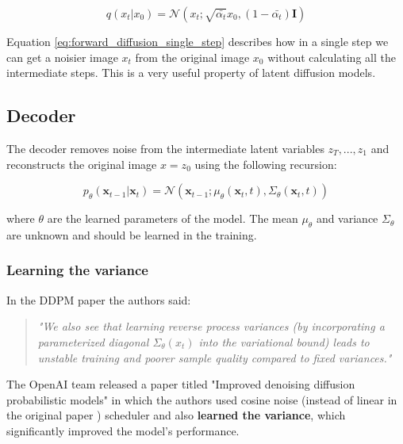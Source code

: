 \begin{equation}
    q(x_t | x_0) = \mathcal{N} (x_t; \sqrt{\bar{\alpha_t}} x_0, (1-\bar{\alpha_t}) \mathbf{I})
    \label{eq:forward_diffusion_single_step}
\end{equation}

Equation \ref{eq:forward_diffusion_single_step} describes how in a single step we can get a noisier image $x_t$ from the original image $x_0$ without calculating all the intermediate steps. This is a very useful property of latent diffusion models.









\subsection{Decoder}

The decoder removes noise from the intermediate latent variables $z_T, ..., z_1$ and reconstructs the original image $x = z_0$ using the following recursion:

\begin{equation}
    p_\theta(\mathbf{x}_{t-1} | \mathbf{x}_t) = \mathcal{N}(\mathbf{x}_{t-1}; \mu_\theta(\mathbf{x}_t, t), \Sigma_\theta(\mathbf{x}_t, t))
    \label{eq:reverse_diffusion}
\end{equation}

where $\theta$ are the learned parameters of the model. The mean $\mu_\theta$ and variance $\Sigma_\theta$ are unknown and should be learned in the training. 


\subsubsection*{Learning the variance}

In the DDPM paper \cite{ddpm} the authors said:

\begin{quote}
    \textit{"We also see that learning reverse process variances (by incorporating a parameterized diagonal $\Sigma_\theta(x_t)$ into the variational bound) leads to unstable training and poorer sample quality compared to fixed variances."} \cite{ddpm}
\end{quote}

The OpenAI team released a paper titled "Improved denoising diffusion probabilistic models" \cite{openai_improved_ddpm} in which the authors used cosine noise (instead of linear in the original paper \cite{ddpm}) scheduler and also \textbf{learned the variance}, which significantly improved the model's performance.








